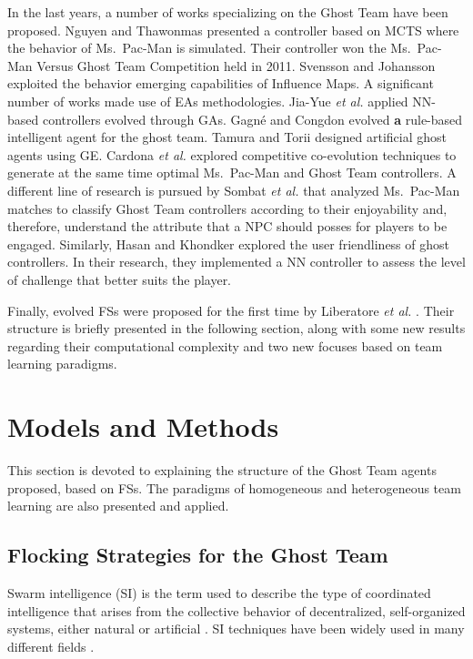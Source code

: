 \documentclass[journal]{IEEEtran}
\begin{document}
In the last years, a number of works specializing on the Ghost Team have been proposed. Nguyen and Thawonmas \cite{Nguyen2011,Nguyen2013} presented a controller based on MCTS where the behavior of Ms.\  Pac-Man is simulated. Their controller won the Ms.\  Pac-Man Versus Ghost Team Competition held in 2011. Svensson and Johansson \cite{Svensson2012} exploited the behavior emerging capabilities of Influence Maps. A significant number of works made use of EAs methodologies. Jia-Yue \emph{et al.} \cite{Jia-Yue11} applied NN-based controllers evolved through GAs. Gagné and Congdon \cite{Gagne2012} evolved \textbf{a} rule-based intelligent agent for the ghost team. Tamura and Torii \cite{Tamura2013} designed artificial ghost agents using GE. Cardona \textit{et al.} \cite{Cardona13} explored competitive co-evolution techniques to generate at the same time optimal Ms.\  Pac-Man and Ghost Team controllers. A different line of research is pursued by Sombat \textit{et al.} \cite{Sombat2012} that analyzed Ms.\  Pac-Man matches to classify Ghost Team controllers according to their enjoyability and, therefore, understand the attribute that a NPC should posses for players to be engaged. Similarly, Hasan and Khondker \cite{Hasan2013} explored the user friendliness of ghost controllers. In their research, they implemented a NN controller to assess the level of challenge that better suits the player.

Finally, evolved FSs were proposed for the first time by Liberatore \emph{et al.} \cite{Liberatore2014}.  Their structure is briefly presented in the following section, along with some new results regarding their computational complexity and two new focuses based on team learning paradigms.

\section{Models and Methods}
\label{sec:ModelsMethods}
This section is devoted to explaining the structure of the Ghost Team agents proposed, based on FSs. The paradigms of homogeneous and heterogeneous team learning are also presented and applied. 

\subsection{Flocking Strategies for the Ghost Team}
Swarm intelligence (SI) is the term used to describe the type of coordinated intelligence that arises from the collective behavior of decentralized, self-organized systems, either natural or artificial \cite{BeniWang89}. SI techniques have been widely used in many different fields \cite{Blum2008}.
\end{document}
